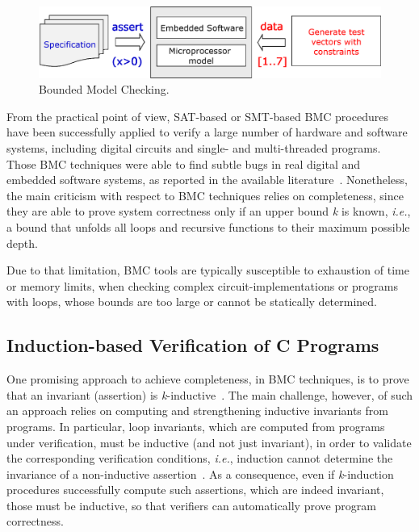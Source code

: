 \documentclass{acm_sen_article}
\begin{document}
\begin{figure}[h]
	\centering
	\includegraphics[scale=0.35]{figure2.eps}
	\caption{Bounded Model Checking.}
	\label{bounded-model-checking}
\end{figure}


From the practical point of view, SAT-based or SMT-based BMC procedures have been successfully applied to verify a large number of hardware and software systems, including digital circuits and single- and multi-threaded programs. Those BMC techniques were able to find subtle bugs in real digital and embedded software systems, as reported in the available literature~\cite{Clarke04,MerzFS12,CordeiroF11,Ivancic05,Cordeiro12}. Nonetheless, the main criticism with respect to BMC techniques relies on completeness, since they are able to prove system correctness only if an upper bound \textit{k} is known, {\it i.e.}, a bound that unfolds all loops and recursive functions to their maximum possible depth. 

Due to that limitation, BMC tools are typically susceptible to exhaustion of time or memory limits, when checking complex circuit-implementations or programs with loops, whose bounds are too large or cannot be statically determined.  

\subsection{Induction-based Verification of C Programs}

One promising approach to achieve completeness, in BMC techniques, is to prove that an invariant (assertion) is \textit{k}-inductive~\cite{EenS03,Sheera00}. The main challenge, however, of such an approach relies on computing and strengthening inductive invariants from programs. In particular, loop invariants, which are computed from programs under verification, must be inductive (and not just invariant), in order to validate the corresponding verification conditions, {\it i.e.}, induction cannot determine the invariance of a non-inductive assertion~\cite{Bradley07}. As a consequence, even if \textit{k}-induction procedures successfully compute such assertions, which are indeed invariant, those must be inductive, so that verifiers can automatically prove program correctness.
\end{document}
